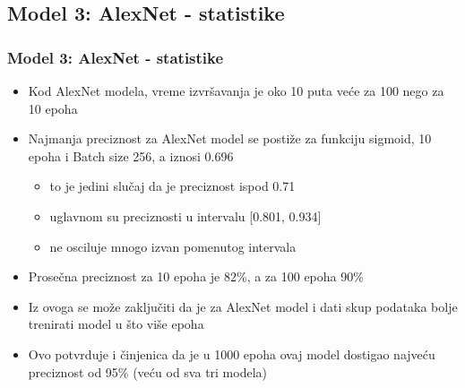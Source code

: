 \documentclass{beamer}
\begin{document}
\subsection{Model 3: AlexNet - statistike}
\begin{frame}
\frametitle{Model 3: AlexNet - statistike}

\begin{itemize}
\item Kod AlexNet modela, vreme izvršavanja je oko 10 puta veće za 100 nego za 10 epoha

\item Najmanja preciznost za AlexNet model se postiže za funkciju sigmoid, 10 epoha i Batch size 256, a iznosi 0.696

\begin{itemize}
\item to je jedini slučaj da je preciznost ispod 0.71
\item uglavnom su preciznosti u intervalu [0.801, 0.934]
\item ne osciluje mnogo izvan pomenutog intervala
\end{itemize}

\item Prosečna preciznost za 10 epoha je 82\%, a za 100 epoha 90\%

\item Iz ovoga se može zaključiti da je za AlexNet model i dati skup podataka
bolje trenirati model u što više epoha
\item Ovo potvrduje i činjenica da je u 1000 epoha ovaj model dostigao najveću preciznost od 95\% (veću od sva tri modela)

\end{itemize}

\end{frame}
\end{document}
